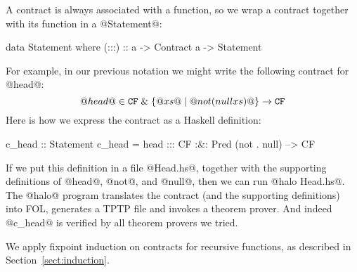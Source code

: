 A contract is always associated with a function, so we wrap a contract
together with its function in a @Statement@:
\begin{code}
data Statement where
    (:::) :: a -> Contract a -> Statement
\end{code}
For example, in our previous notation we might write the following
contract for @head@:
$$
@head@ \in {\tt CF} \;\&\; \{@xs@ \mid @not (null xs)@ \} \rightarrow {\tt CF}
$$
Here is how we express the contract as a Haskell definition:
\begin{comment}
head (x:xs) = x
head []     = error "empty list"

not True = False    null [] = True
not False = True    null xs = False

f . g = \x -> f (g x)
\end{comment}
\begin{code}
c_head :: Statement
c_head = head ::: CF :&: Pred (not . null) --> CF
\end{code}
If we put this definition in a file @Head.hs@, together with the supporting
definitions of @head@, @not@, and @null@, 
then we can run @halo Head.hs@. 
The @halo@ program translates the contract (and the supporting definitions) into
FOL, generates a TPTP file and invokes a theorem prover.
And indeed @c_head@ is verified by all theorem provers we tried.

We apply fixpoint induction on contracts for recursive functions, as
described in Section~\ref{sect:induction}.

